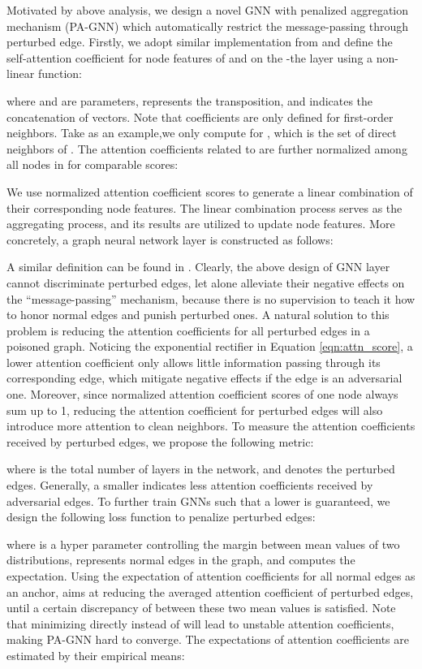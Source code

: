 \documentclass[sigconf]{acmart}
\newcommand{\ours}{{PA-GNN}\xspace}
\begin{document}
Motivated by above analysis, we design a novel GNN with penalized aggregation mechanism (\ours) which automatically restrict the message-passing through perturbed edge.
Firstly, we adopt similar implementation from \cite{vaswani2017attention} and define the self-attention coefficient  for node features of  and  on the -the layer using a non-linear function:

where  and  are parameters,  represents the transposition, and  indicates the concatenation of vectors.
Note that coefficients are only defined for first-order neighbors. 
Take  as an example,we only compute  for , which is the set of direct neighbors of . The attention coefficients related to  are further normalized among all nodes in  for comparable scores:

We use normalized attention coefficient scores to generate a linear combination of their corresponding node features. The linear combination process serves as the aggregating process, and its results are utilized to update node features.
More concretely, a graph neural network layer is constructed as follows:

A similar definition can be found in \cite{velivckovic2017graph}.
Clearly, the above design of GNN layer cannot discriminate perturbed edges, let alone alleviate their negative effects on the ``message-passing'' mechanism, because there is no supervision to teach it how to honor normal edges and punish perturbed ones.
A natural solution to this problem is reducing the attention coefficients for all perturbed edges in a poisoned graph. Noticing the exponential rectifier in Equation \ref{eqn:attn_score}, a lower attention coefficient only allows little information passing through its corresponding edge, which mitigate negative effects if the edge is an adversarial one. Moreover, since normalized attention coefficient scores of one node always sum up to 1, reducing the attention coefficient for perturbed edges will also introduce more attention to clean neighbors. To measure the attention coefficients received by perturbed edges, we propose the following metric:

where  is the total number of layers in the network, and  denotes the perturbed edges. Generally, a smaller  indicates less attention coefficients received by adversarial edges. To further train GNNs such that a lower  is guaranteed, we design the following loss function to penalize perturbed edges:

where  is a hyper parameter controlling the margin between mean values of two distributions,  represents normal edges in the graph, and  computes the expectation. Using the expectation of attention coefficients for all normal edges as an anchor,  aims at reducing the averaged attention coefficient of perturbed edges, until a certain discrepancy of  between these two mean values is satisfied. 
Note that minimizing  directly instead of  will lead to unstable attention coefficients, making \ours hard to converge. 
The expectations of attention coefficients are estimated by their empirical means:
\end{document}
